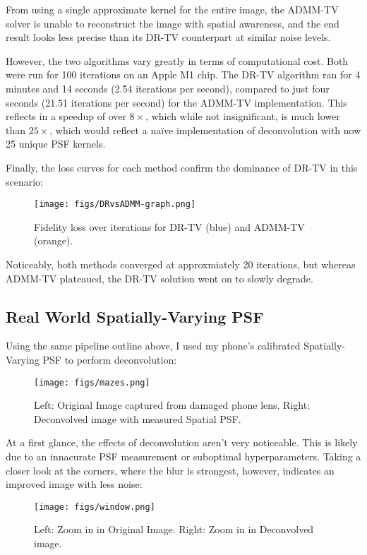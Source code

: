 \documentclass[sigconf]{acmart}
\begin{document}
From using a single approximate kernel for the entire image, the ADMM-TV solver is unable to reconstruct the image with spatial awareness, and the end result looks less precise than its DR-TV counterpart at similar noise levels. 

However, the two algorithms vary greatly in terms of computational cost. Both were run for 100 iterations on an Apple M1 chip. The DR-TV algorithm ran for 4 minutes and 14 seconds (2.54 iterations per second), compared to just four seconds (21.51 iterations per second) for the ADMM-TV implementation. This reflects in a speedup of over $8 \times$, which while not insignificant, is much lower than $25\times$, which would reflect a naïve implementation of deconvolution with now 25 unique PSF kernels.

Finally, the loss curves for each method confirm the dominance of DR-TV in this scenario:
\begin{figure}[h]
  \centering
  \texttt{[image: figs/DRvsADMM-graph.png]}
  \caption{Fidelity loss over iterations for DR-TV (blue) and ADMM-TV (orange).}
  \label{fig:dr-randres}
\end{figure}
Noticeably, both methods converged at approxmiately 20 iterations, but whereas ADMM-TV plateaued, the DR-TV solution went on to slowly degrade.

\subsection{Real World Spatially-Varying PSF}
Using the same pipeline outline above, I used my phone's calibrated Spatially-Varying PSF to perform deconvolution:
\begin{figure}[h]
  \centering
  \texttt{[image: figs/mazes.png]}
  \caption{Left: Original Image captured from damaged phone lens. Right: Deconvolved image with measured Spatial PSF.}
  \label{fig:mazes}
\end{figure}

At a first glance, the effects of deconvolution aren't very noticeable. This is likely due to an innacurate PSF measurement or suboptimal hyperparameters. Taking a closer look at the corners, where the blur is strongest, however, indicates an improved image with less noise:

\begin{figure}[h]
  \centering
  \texttt{[image: figs/window.png]}
  \caption{Left: Zoom in in Original Image. Right: Zoom in in Deconvolved image.}
  \label{fig:dr-randres}
\end{figure}
\end{document}
